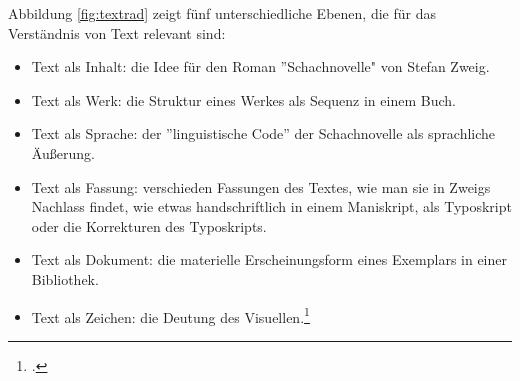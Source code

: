 \documentclass[12pt,a4paper]{article}
\begin{document}
Abbildung \ref{fig:textrad} zeigt fünf unterschiedliche Ebenen, die für das Verständnis von Text relevant sind:
\begin{itemize}
    \item Text als Inhalt: die Idee für den Roman ''Schachnovelle" von Stefan Zweig.
    \item Text als Werk: die Struktur eines Werkes als Sequenz in einem Buch.
    \item Text als Sprache: der ''linguistische Code'' der Schachnovelle als sprachliche Äußerung.
    \item Text als Fassung: verschieden Fassungen des Textes, wie man sie in Zweigs Nachlass findet, wie etwas handschriftlich in einem Maniskript, als Typoskript oder die Korrekturen des Typoskripts. 
    \item Text als Dokument: die materielle Erscheinungsform eines Exemplars in einer Bibliothek.
    \item Text als Zeichen: die Deutung des Visuellen.\footcite[][S.46]{sahle2013digitale}
\end{itemize}
\end{document}
